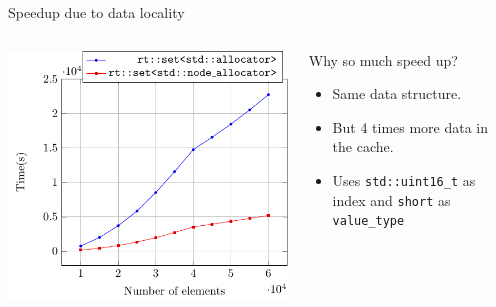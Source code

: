 \documentclass[10pt,aspectratio=169]{beamer}
\begin{document}
\begin{frame}
{Speedup due to data locality}
\begin{columns}

    \begin{column}{0.47\textwidth}
        \begin{center}
            \includegraphics[scale=0.7]{fig/rtset_bench.pdf} \\
        \end{center}
    \end{column}

    \begin{column}{0.47\textwidth}
         \begin{block}{Why so much speed up?}
           \begin{itemize}
           \item Same data structure.
           \item But 4 times more data in the cache.
           \item Uses \texttt{std::uint16\_t} as index
           and \texttt{short} as \texttt{value\_type}
           \end{itemize}
         \end{block}
    \end{column}

\end{columns}
\end{frame}
\end{document}
